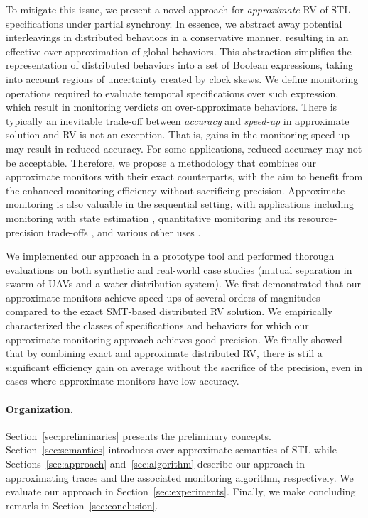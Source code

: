 To mitigate this issue, we present a novel approach for \emph{approximate} RV of STL 
specifications under partial synchrony.
%
In essence, we abstract away potential interleavings in distributed behaviors in a conservative 
manner, resulting in an effective over-approximation of global behaviors.
%
This abstraction simplifies the representation of distributed behaviors into a set of Boolean 
expressions, taking into account regions of uncertainty created by clock skews.
%
We define monitoring operations required to evaluate temporal specifications over such expression, 
which result in monitoring verdicts on over-approximate behaviors.
%
There is typically an inevitable trade-off between {\em accuracy} and {\em speed-up} in approximate 
solution and  RV is not an exception.
%
That is, gains in the monitoring speed-up may result in reduced accuracy.
%
For some applications, reduced accuracy may not be acceptable.
%
Therefore, we propose a methodology that combines our approximate monitors with their exact 
counterparts, with the aim to benefit from the enhanced monitoring efficiency without sacrificing 
precision.
%
\alert{
Approximate monitoring is also valuable in the sequential setting, with applications including
monitoring with state estimation \cite{StollerBSGHSZ11,BartocciG13},
quantitative monitoring and its resource-precision trade-offs \cite{HenzingerS21,HenzingerMS22,HenzingerMS23},
and various other uses \cite{AlechinaDL14,AcetoAFIL21}.
}


We implemented our approach in a prototype tool and performed thorough evaluations on both 
synthetic and real-world case studies (mutual separation in swarm of UAVs and a water distribution 
system).
%
We first demonstrated that our approximate monitors achieve speed-ups of several orders of 
magnitudes compared to the exact SMT-based distributed RV solution.
%
We empirically characterized the classes of specifications and behaviors for which our approximate 
monitoring approach achieves good precision.
%
We finally showed that by combining exact and approximate distributed RV, there is still a 
significant efficiency gain on average without the sacrifice of the precision, even in cases where 
approximate monitors have low accuracy. 

\paragraph{Organization.}
Section~\ref{sec:preliminaries} presents the preliminary concepts.
%
Section~\ref{sec:semantics} introduces over-approximate semantics of STL while 
Sections~\ref{sec:approach} and~\ref{sec:algorithm} describe our approach in approximating traces 
and the associated monitoring algorithm, respectively.
%
We evaluate our approach in Section~\ref{sec:experiments}. Finally, we make concluding remarls in 
Section~\ref{sec:conclusion}.